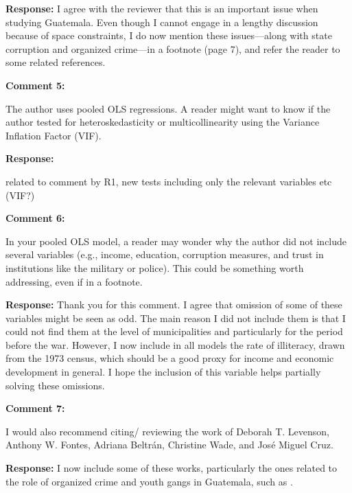 \documentclass[12pt, a4paper, notitlepage]{article}
\begin{document}
\noindent\textbf{Response:} I agree with the reviewer that this is an important issue when studying Guatemala. Even though I cannot engage in a lengthy discussion because of space constraints, I do now mention these issues---along with state corruption and organized crime---in a footnote (page 7), and refer the reader to some related references.

\vspace{15pt}
\noindent\textbf{Comment 5:}
\begin{displayquote}
The author uses pooled OLS regressions. A reader might want to know if the author tested for heteroskedasticity or multicollinearity using the Variance Inflation Factor (VIF).
\end{displayquote}

\noindent\textbf{Response:} {}

related to comment by R1, new tests including only the relevant variables etc (VIF?)

\vspace{15pt}
\noindent\textbf{Comment 6:}
\begin{displayquote}
In your pooled OLS model, a reader may wonder why the author did not include several variables (e.g., income, education, corruption measures, and trust in institutions like the military or police). This could be something worth addressing, even if in a footnote.
\end{displayquote}

\noindent\textbf{Response:} Thank you for this comment. I agree that omission of some of these variables might be seen as odd. The main reason I did not include them is that I could not find them at the level of municipalities and particularly for the period before the war. However, I now include in all models the rate of illiteracy, drawn from the 1973 census, which should be a good proxy for income and economic development in general. I hope the inclusion of this variable helps partially solving these omissions.

\vspace{15pt}
\noindent\textbf{Comment 7:}
\begin{displayquote}
I would also recommend citing/ reviewing the work of Deborah T. Levenson, Anthony W. Fontes, Adriana Beltrán, Christine Wade, and José Miguel Cruz.
\end{displayquote}

\noindent\textbf{Response:} I now include some of these works, particularly the ones related to the role of organized crime and youth gangs in Guatemala, such as \citet{Peacock:2003tt, Beltran:2016td, Booth:2010wd, Levenson:2013tm}.




\end{document}

